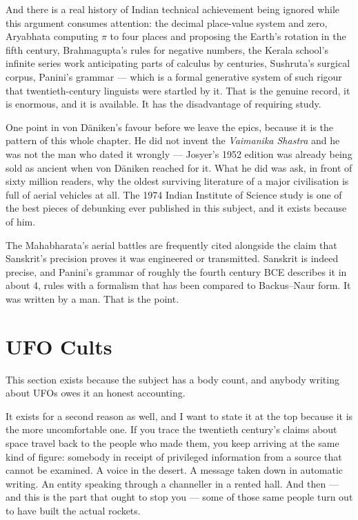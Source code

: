 And there is a real history of Indian technical achievement being ignored while this argument
consumes attention: the decimal place-value system and zero, Aryabhata computing $\pi$ to four
places and proposing the Earth's rotation in the fifth century, Brahmagupta's rules for
negative numbers, the Kerala school's infinite series work anticipating parts of calculus by
centuries, Sushruta's surgical corpus, Panini's grammar --- which is a formal generative system
of such rigour that twentieth-century linguists were startled by it. That is the genuine record,
it is enormous, and it is available. It has the disadvantage of requiring study.

One point in von Däniken's favour before we leave the epics, because it is the pattern of this whole
chapter. He did not invent the \emph{Vaimanika Shastra} and he was not the man who dated it wrongly
--- Josyer's 1952 edition was already being sold as ancient when von Däniken reached for it. What he
did was ask, in front of sixty million readers, why the oldest surviving literature of a major
civilisation is full of aerial vehicles at all. 
The 1974 Indian Institute of Science study is one of the best pieces of debunking ever published in
this subject, and it exists because of him.

\begin{funfact}
The Mahabharata's aerial battles are frequently cited alongside the claim that Sanskrit's
precision proves it was engineered or transmitted. Sanskrit is indeed precise, and Panini's
grammar of roughly the fourth century BCE describes it in about 4, rules with a formalism
that has been compared to Backus--Naur form. It was written by a man. That is the point.
\end{funfact}

\section{UFO Cults}\label{sec:ufocults}

This section exists because the subject has a body count, and anybody writing about UFOs owes it
an honest accounting.

It exists for a second reason as well, and I want to state it at the top because it is the more
uncomfortable one. If you trace the twentieth century's claims about space travel back to the
people who made them, you keep arriving at the same kind of figure: somebody in receipt of
privileged information from a source that cannot be examined. A voice in the desert. A message
taken down in automatic writing. An entity speaking through a channeller in a rented hall. And
then --- and this is the part that ought to stop you --- some of those same people turn out to
have built the actual rockets.

